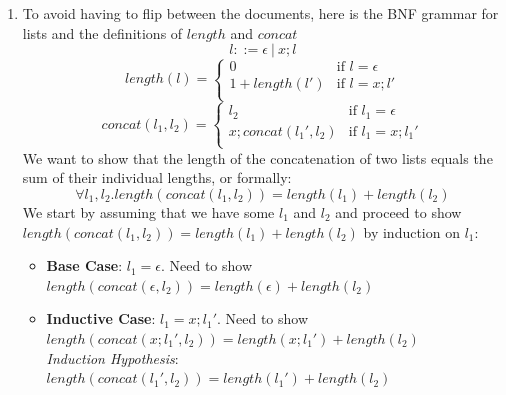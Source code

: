 \documentclass{tufte-handout}
\begin{document}
\begin{enumerate}
\item To avoid having to flip between the documents, here is the
  BNF grammar for lists and the definitions of $\mathit{length}$
  and $\mathit{concat}$
  \[
    l ::= \epsilon ~|~ x;l
  \]
  \[
  \mathit{length}(l) =
  \begin{cases}
    0 & \text{if } l = \epsilon\\
    1 + \mathit{length}(l')& \text{if } l = x; l'\\
  \end{cases}
  \]
  \[
  \mathit{concat}(l_1, l_2) =
  \begin{cases}
    l_2 & \text{if } l_1 = \epsilon\\
    x; \mathit{concat}(l_1', l_2) & \text{if } l_1 = x; l_1'\\
  \end{cases}
  \]
  We want to show that the length of the concatenation of two
  lists equals the sum of their individual lengths, or formally:
  \[
    \forall l_1,l_2. length(concat(l_1, l_2)) = length(l_1) + length(l_2)
  \]
  We start by assuming that we have some $l_1$ and $l_2$ and
  proceed to show
  $length(concat(l_1, l_2)) = length(l_1) + length(l_2)$ by
  induction on $l_1$:
  \begin{itemize}
  \item \textbf{Base Case}: $l_1 = \epsilon$. Need to show $\mathit{length}(\mathit{concat}(\epsilon, l_2)) = \mathit{length}(\epsilon) + \mathit{length}(l_2)$
  \item \textbf{Inductive Case}: $l_1 = x; l_1'$. Need to show
    $\mathit{length}(\mathit{concat}(x;l_1', l_2)) = \mathit{length}(x;l_1') + \mathit{length}(l_2)$\\
    \textit{Induction Hypothesis}: $\mathit{length}(\mathit{concat}(l_1', l_2)) = \mathit{length}(l_1') + \mathit{length}(l_2)$
\end{itemize}
\end{enumerate}
\end{document}
